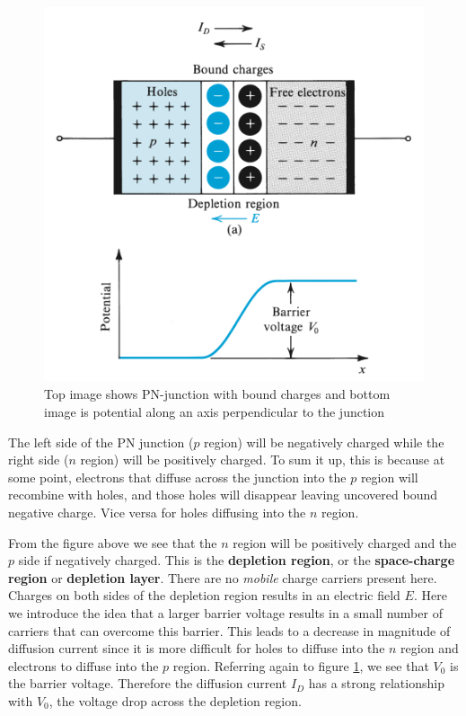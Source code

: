\begin{figure}[H]
    \centering
    \includegraphics[scale=0.5]{figs/ch03/uncovered_region.png}
    \caption{Top image shows PN-junction with bound charges and bottom image is potential along an axis perpendicular to the junction}
    \label{fig:barrier-voltage1}
\end{figure}

The left side of the PN junction ($p$ region) will be negatively charged while the right side ($n$ region) will be positively charged. To sum it up, this is because at some point, electrons that diffuse across the junction into the $p$ region will recombine with holes, and those holes will disappear leaving uncovered bound negative charge. Vice versa for holes diffusing into the $n$ region. 

From the figure above we see that the $n$ region will be positively charged and the $p$ side if negatively charged. This is the \textbf{depletion region}, or the \textbf{space-charge region} or \textbf{depletion layer}. There are no \textit{mobile} charge carriers present here. Charges on both sides of the depletion region results in an electric field $E$. Here we introduce the idea that a larger barrier voltage results in a small number of carriers that can overcome this barrier. This leads to a decrease in magnitude of diffusion current since it is more difficult for holes to diffuse into the $n$ region and electrons to diffuse into the $p$ region. Referring again to figure \ref{fig:barrier-voltage1}, we see that $V_0$ is the barrier voltage. Therefore the diffusion current $I_D$ has a strong relationship with $V_0$, the voltage drop across the depletion region.

